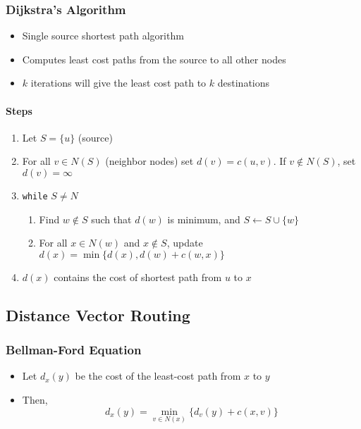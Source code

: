 \subsubsection{Dijkstra's Algorithm}
\begin{itemize}
	\item Single source shortest path algorithm
	\item Computes least cost paths from the source to all other nodes
	\item \(k\) iterations will give the least cost path to \(k\) destinations
\end{itemize}

\paragraph{Steps}
\begin{enumerate}
	\item Let \(S = \{u\}\) (source)
	\item For all \(v \in N(S)\) (neighbor nodes) set \(d(v) = c(u, v)\). If \(v\notin N(S)\), set \(d(v) = \infty\)
	\item \texttt{while} \(S \neq N\)
	\begin{enumerate}
		\item Find \(w\notin S\) such that \(d(w)\) is minimum, and \(S \leftarrow S\cup \{w\}\)
		\item For all \(x\in N(w)\) and \(x\notin S\), update \(d(x) = \min\{d(x), d(w) + c(w, x)\}\)
	\end{enumerate}
	\item \(d(x)\) contains the cost of shortest path from \(u\) to \(x\)
\end{enumerate}

\subsection{Distance Vector Routing}
\subsubsection{Bellman-Ford Equation}
\begin{itemize}
	\item Let \(d_x(y)\) be the cost of the least-cost path from \(x\) to \(y\)
	\item Then,
	\[
		d_x(y) = \min_{v\in N(x)}\{d_v(y) + c(x, v)\}
	\]
\end{itemize}

